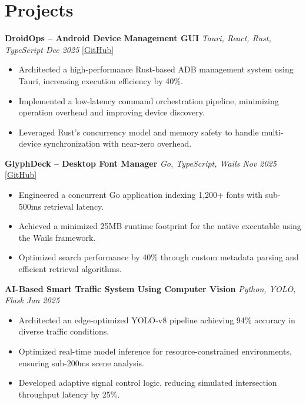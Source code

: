 \documentclass[a4paper,10pt]{article}
\begin{document}
\section*{Projects}

\textbf{DroidOps -- Android Device Management GUI} \hfill \textit{Tauri, React, Rust, TypeScript \quad Dec 2025} \quad \href{https://github.com/bbinxx/droidops}{[GitHub]}
\begin{itemize}
\item Architected a high-performance Rust-based ADB management system using Tauri, increasing execution efficiency by 40\%.
\item Implemented a low-latency command orchestration pipeline, minimizing operation overhead and improving device discovery.
\item Leveraged Rust's concurrency model and memory safety to handle multi-device synchronization with near-zero overhead.
\end{itemize}

\vspace{4pt}

\textbf{GlyphDeck -- Desktop Font Manager} \hfill \textit{Go, TypeScript, Wails \quad Nov 2025} \quad \href{https://github.com/bbinxx/GlyphDeck}{[GitHub]}
\begin{itemize}
\item Engineered a concurrent Go application indexing 1,200+ fonts with sub-500ms retrieval latency.
\item Achieved a minimized 25MB runtime footprint for the native executable using the Wails framework.
\item Optimized search performance by 40\% through custom metadata parsing and efficient retrieval algorithms.
\end{itemize}

\vspace{4pt}

\textbf{AI-Based Smart Traffic System Using Computer Vision} \hfill \textit{Python, YOLO, Flask \quad Jan 2025}
\begin{itemize}
\item Architected an edge-optimized YOLO-v8 pipeline achieving 94\% accuracy in diverse traffic conditions.
\item Optimized real-time model inference for resource-constrained environments, ensuring sub-200ms scene analysis.
\item Developed adaptive signal control logic, reducing simulated intersection throughput latency by 25\%.
\end{itemize}
\end{document}
